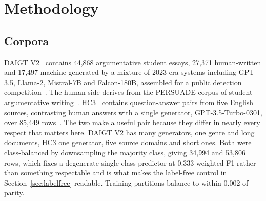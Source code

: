 \section{Methodology}
\label{sec:method}

\subsection{Corpora}

DAIGT V2~\cite{Thedrcat2023daigtv2} contains 44,868 argumentative student essays, 27,371 human-written and 17,497 machine-generated by a mixture of 2023-era systems including GPT-3.5, Llama-2, Mistral-7B and Falcon-180B, assembled for a public detection competition~\cite{Kaggle2023llmdetect}. The human side derives from the PERSUADE corpus of student argumentative writing~\cite{Crossley2023persuade}. HC3~\cite{Guo2023close} contains question-answer pairs from five English sources, contrasting human answers with a single generator, GPT-3.5-Turbo-0301, over 85,449 rows~\cite{HelloSimpleAI2023hc3}. The two make a useful pair because they differ in nearly every respect that matters here. DAIGT V2 has many generators, one genre and long documents, HC3 one generator, five source domains and short ones. Both were class-balanced by downsampling the majority class, giving 34,994 and 53,806 rows, which fixes a degenerate single-class predictor at 0.333 weighted F1 rather than something respectable and is what makes the label-free control in Section~\ref{sec:labelfree} readable. Training partitions balance to within 0.002 of parity.

